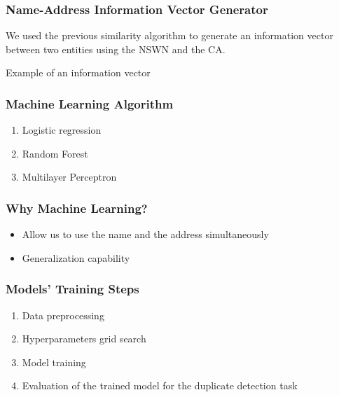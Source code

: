 \documentclass{beamer}
\begin{document}
	\begin{frame}\frametitle{Name-Address Information Vector Generator}
		We used the previous similarity algorithm to generate an information vector between two entities using the NSWN and the CA.
		\begin{block}{Example of an information vector}
		\end{block}
	\end{frame}

	\begin{frame}\frametitle{Machine Learning Algorithm}
		\begin{enumerate}
			\item Logistic regression
			\item Random Forest
			\item Multilayer Perceptron
		\end{enumerate}
	\end{frame}

	\begin{frame}\frametitle{Why Machine Learning?}
		\begin{itemize}
			\item Allow us to use the name and the address simultaneously
			\item Generalization capability
		\end{itemize}
	\end{frame}

	\begin{frame}\frametitle{Models' Training Steps}
		\begin{enumerate}
			\item Data preprocessing
			\item Hyperparameters grid search
			\item Model training
			\item Evaluation of the trained model for the duplicate detection task
		\end{enumerate}
	\end{frame}
	
\end{document}
